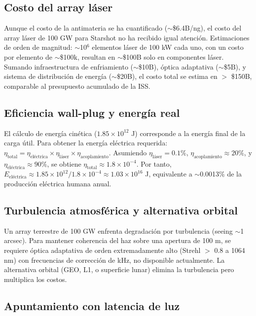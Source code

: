 \documentclass[11pt,a4paper,onecolumn]{article}
\begin{document}
\subsection{Costo del array láser}

Aunque el costo de la antimateria se ha cuantificado ($\sim$\$6.4B/ng), el costo del array láser de 100 GW para Starshot no ha recibido igual atención. Estimaciones de orden de magnitud: $\sim$10$^6$ elementos láser de 100 kW cada uno, con un costo por elemento de $\sim$\$100k, resultan en $\sim$\$100B solo en componentes láser. Sumando infraestructura de enfriamiento ($\sim$\$10B), óptica adaptativa ($\sim$\$5B), y sistema de distribución de energía ($\sim$\$20B), el costo total se estima en $>$ \$150B, comparable al presupuesto acumulado de la ISS.

\subsection{Eficiencia wall-plug y energía real}

El cálculo de energía cinética ($1.85\times10^{12}$ J) corresponde a la energía final de la carga útil. Para obtener la energía eléctrica requerida: $\eta_{\text{total}} = \eta_{\text{eléctrica}} \times \eta_{\text{láser}} \times \eta_{\text{acoplamiento}}$. Asumiendo $\eta_{\text{láser}} = 0.1\%$, $\eta_{\text{acoplamiento}} \approx 20\%$, y $\eta_{\text{eléctrica}} \approx 90\%$, se obtiene $\eta_{\text{total}} \approx 1.8\times10^{-4}$. Por tanto, $E_{\text{eléctrica}} \approx 1.85\times10^{12} / 1.8\times10^{-4} \approx 1.03\times10^{16}$ J, equivalente a $\sim$0.0013\% de la producción eléctrica humana anual.

\subsection{Turbulencia atmosférica y alternativa orbital}

Un array terrestre de 100 GW enfrenta degradación por turbulencia (seeing $\sim$1 arcsec). Para mantener coherencia del haz sobre una apertura de 100 m, se requiere óptica adaptativa de orden extremadamente alto (Strehl $>$ 0.8 a 1064 nm) con frecuencias de corrección de kHz, no disponible actualmente. La alternativa orbital (GEO, L1, o superficie lunar) elimina la turbulencia pero multiplica los costos.

\subsection{Apuntamiento con latencia de luz}
\end{document}
